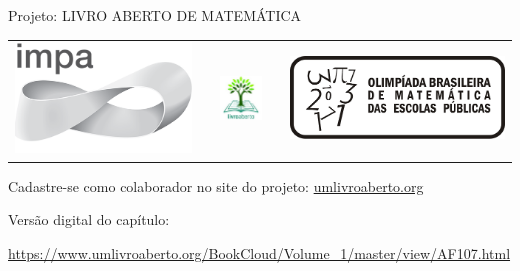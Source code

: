 \begin{center}
Projeto: LIVRO ABERTO DE MATEMÁTICA

\noindent \begin{tabular}{lcccr}
\includegraphics[scale=.15]{impa}& \quad\quad& \includegraphics[width=3cm]{logo} & \quad\quad& \includegraphics[scale=.24]{obmep} 
\end{tabular}
\end{center}

\vspace*{.3cm}

Cadastre-se como colaborador no site do projeto: \url{umlivroaberto.org}

Versão digital do capítulo:

\url{https://www.umlivroaberto.org/BookCloud/Volume_1/master/view/AF107.html}


